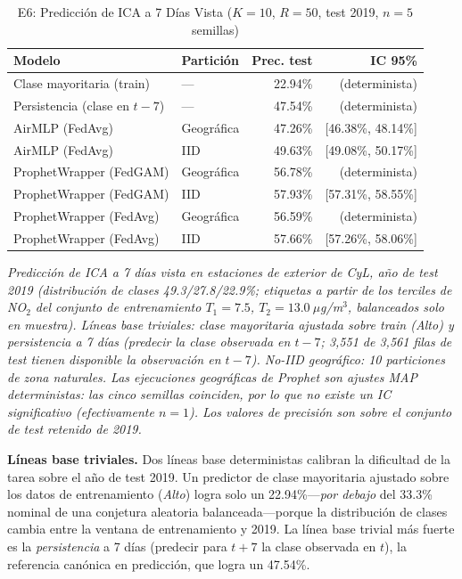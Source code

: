 \documentclass[journal]{IEEEtran}
\begin{document}
\begin{table}[t]
\centering
\caption{E6: Predicción de ICA a 7 Días Vista ($K{=}10$, $R{=}50$, test 2019, $n{=}5$ semillas)}
\label{tab:e6}
\footnotesize
\begin{tabular}{l l r r}
\toprule
\textbf{Modelo} & \textbf{Partición} & \textbf{Prec. test} & \textbf{IC 95\%} \\
\midrule
Clase mayoritaria (train)   & ---        & 22.94\% & (determinista) \\
Persistencia (clase en $t{-}7$) & ---     & 47.54\% & (determinista) \\
\midrule
AirMLP (FedAvg)             & Geográfica & 47.26\% & [46.38\%, 48.14\%] \\
AirMLP (FedAvg)             & IID        & 49.63\% & [49.08\%, 50.17\%] \\
\midrule
ProphetWrapper (FedGAM)     & Geográfica & 56.78\% & (determinista) \\
ProphetWrapper (FedGAM)     & IID        & 57.93\% & [57.31\%, 58.55\%] \\
ProphetWrapper (FedAvg)     & Geográfica & 56.59\% & (determinista) \\
ProphetWrapper (FedAvg)     & IID        & 57.66\% & [57.26\%, 58.06\%] \\
\bottomrule
\end{tabular}
\vspace{0.5em}

\emph{Predicción de ICA a 7 días vista en estaciones de exterior de CyL, año de test 2019 (distribución de clases 49.3/27.8/22.9\%; etiquetas a partir de los terciles de NO$_2$ del conjunto de entrenamiento $T_1{=}7.5$, $T_2{=}13.0~\mu$g/m$^3$, balanceados solo en muestra). Líneas base triviales: clase mayoritaria ajustada sobre train (\textit{Alto}) y persistencia a 7 días (predecir la clase observada en $t{-}7$; 3,551 de 3,561 filas de test tienen disponible la observación en $t{-}7$). No-IID geográfico: 10 particiones de zona naturales. Las ejecuciones geográficas de Prophet son ajustes MAP deterministas: las cinco semillas coinciden, por lo que no existe un IC significativo (efectivamente $n{=}1$). Los valores de precisión son sobre el conjunto de test retenido de 2019.}
\end{table}

\textbf{Líneas base triviales.} Dos líneas base deterministas calibran la dificultad de la tarea sobre el año de test 2019. Un predictor de clase mayoritaria ajustado sobre los datos de entrenamiento (\textit{Alto}) logra solo un 22.94\%---\emph{por debajo} del 33.3\% nominal de una conjetura aleatoria balanceada---porque la distribución de clases cambia entre la ventana de entrenamiento y 2019. La línea base trivial más fuerte es la \emph{persistencia} a 7 días (predecir para $t{+}7$ la clase observada en $t$), la referencia canónica en predicción, que logra un 47.54\%.
\end{document}

